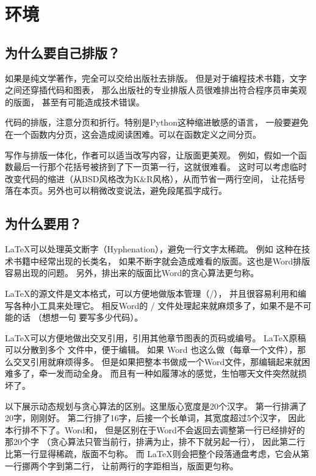 \chapter{环境}

\section{为什么要自己排版？}
\label{sec:whyTypesetting}

如果是纯文学著作，完全可以交给出版社去排版。
但是对于编程技术书籍，文字之间还穿插代码和图表，
那么出版社的专业排版人员很难排出符合程序员审美观的版面，
甚至有可能造成技术错误。


\begindot
\item 代码的排版，注意分页和折行。特别是Python这种缩进敏感的语言，
一般要避免在一个函数内分页，这会造成阅读困难。可以在函数定义之间分页。

\item 写作与排版一体化，作者可以适当改写内容，让版面更美观。
例如，假如一个函数最后一行那个花括号被挤到了下一页第一行，这就很难看。
这时可以考虑临时改变代码的缩进（从BSD风格改为K\&R风格），从而节省一两行空间，
让花括号落在本页。另外也可以稍微改变说法，避免段尾孤字成行。
\myenddot


\section{为什么要用？}
\begindot
\item \LaTeX 可以处理英文断字（Hyphenation），避免一行文字太稀疏。
例如 这种在技术书籍中经常出现的长类名，
如果不断字就会造成难看的版面。这也是Word排版容易出现的问题。
另外，排出来的版面比Word的贪心算法更匀称。

\item \LaTeX 的源文件是文本格式，可以方便地做版本管理（/），
并且很容易利用和编写各种小工具来处理它。
相反Word的 / 文件处理起来就麻烦多了，如果不是不可能的话
（想想一句  要写多少代码）。

\item \LaTeX 可以方便地做出交叉引用，引用其他章节图表的页码或编号。
\LaTeX 原稿可以分散到多个  文件中，便于编辑。
如果 Word 也这么做（每章一个文件），那么交叉引用就麻烦得多。
但是如果把整本书做成一个Word文件，那编辑起来就困难多了，牵一发而动全身。
而且有一种如履薄冰的感觉，生怕哪天文件突然就损坏了。
\myenddot

以下展示动态规划与贪心算法的区别。这里版心宽度是20个汉字。
第一行排满了20字，刚刚好。
第二行排了16字，后接一个长单词，其宽度超过5个汉字，
因此本行排不下了。Word和，
但是区别在于Word不会返回去调整第一行已经排好的那20个字%
（贪心算法只管当前行，排满为止，排不下就另起一行），
因此第二行比第一行显得稀疏，版面不匀称。
而 \LaTeX 则会把整个段落通盘考虑，它会从第一行挪两个字到第二行，
让前两行的字距相当，版面更匀称。


